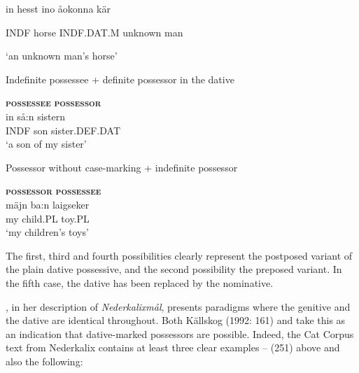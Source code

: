 in  hesst  ino  åokonna  kär

INDF  horse  INDF.DAT.M  unknown  man

\glt  ‘an unknown man’s horse’
\z

\item 

Indefinite possessee + definite possessor in the dative



\ea\label{}
\gll \textbf{\textsc{possessee}} \textbf{\textsc{possessor}}\\
\gll in  så:n  sistern\\
INDF  son  sister.DEF.DAT\\
\glt ‘a son of my sister’
\z

\item 

Possessor without case-marking + indefinite possessor



\ea\label{}
\gll \textbf{\textsc{possessor}} \textbf{\textsc{possessee}}\\
\gll mäjn  ba:n  laigseker\\
my  child.PL  toy.PL\\
\glt ‘my children’s toys’
\z

The first, third and fourth possibilities clearly represent the postposed variant of the plain dative possessive, and the second possibility the preposed variant. In the fifth case, the dative has been replaced by the nominative.  


\citet{Rutberg1924}, in her description of \textit{Nederkalixmål}, presents paradigms where the genitive and the dative are identical throughout. Both Källskog (1992: 161) and \citet[42]{Delsing2003a} take this as an indication that dative-marked possessors are possible. Indeed, the Cat Corpus text from Nederkalix contains at least three clear examples – (251) above and also the following:

